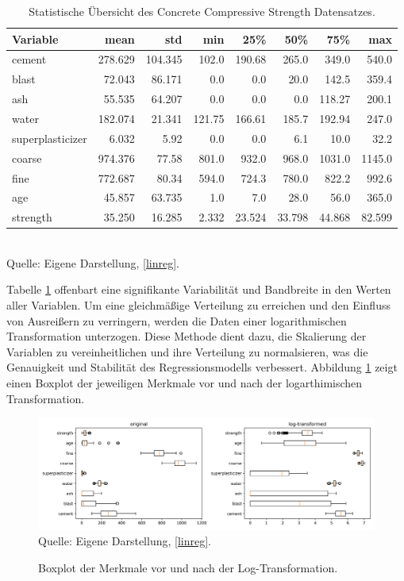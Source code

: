 \begin{table}[!h]
    \caption{Statistische Übersicht des Concrete Compressive Strength Datensatzes.}
    \footnotesize
    \begin{tabularx}{\textwidth}{Xrrrrrrr}
    \toprule
    Variable & mean & std & min & 25\% & 50\% & 75\% & max \\
    \midrule
    cement & 278.629 & 104.345 & 102.0 & 190.68 & 265.0 & 349.0 & 540.0 \\
    blast & 72.043 & 86.171 & 0.0 & 0.0 & 20.0 & 142.5 & 359.4 \\
    ash & 55.535 & 64.207 & 0.0 & 0.0 & 0.0 & 118.27 & 200.1 \\
    water & 182.074 & 21.341 & 121.75 & 166.61 & 185.7 & 192.94 & 247.0 \\
    superplasticizer & 6.032 & 5.92 & 0.0 & 0.0 & 6.1 & 10.0 & 32.2 \\
    coarse & 974.376 & 77.58 & 801.0 & 932.0 & 968.0 & 1031.0 & 1145.0 \\
    fine & 772.687 & 80.34 & 594.0 & 724.3 & 780.0 & 822.2 & 992.6 \\
    age & 45.857 & 63.735 & 1.0 & 7.0 & 28.0 & 56.0 & 365.0 \\
    strength & 35.250 & 16.285 & 2.332 & 23.524 & 33.798 & 44.868 & 82.599 \\
    \bottomrule
    \end{tabularx}
    \label{tab:statistics}
    \normalsize
    \\ Quelle: Eigene Darstellung, \ref{linreg}.
\end{table}

Tabelle \ref{tab:statistics} offenbart eine signifikante Variabilität und Bandbreite 
in den Werten aller Variablen. Um eine gleichmäßige Verteilung zu erreichen und den 
Einfluss von Ausreißern zu verringern, werden die Daten einer logarithmischen Transformation unterzogen. 
Diese Methode dient dazu, die Skalierung der Variablen zu vereinheitlichen und ihre Verteilung zu normalsieren, 
was die Genauigkeit und Stabilität des Regressionsmodells verbessert.
Abbildung \ref{pic:box} zeigt einen Boxplot der jeweiligen Merkmale vor und 
nach der logarthimischen Transformation.

\begin{figure}[!h]
    \caption{Boxplot der Merkmale vor und nach der Log-Transformation.}
    \includegraphics[width=1\textwidth]{../scripts/images/boxplot.png}
    Quelle: Eigene Darstellung, \ref{linreg}.
    \label{pic:box}
\end{figure}

